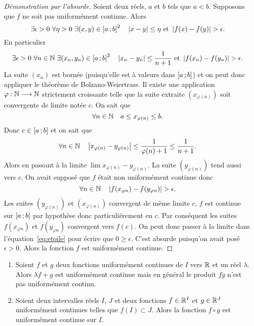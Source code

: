 \begin{proof}[Démonstration par l'absurde]
  Soient deux réels, $a$ et $b$ tels que $a<b$. Supposons que $f$ ne soit pas uniformément continue. Alors
  \begin{equation}
    \exists \epsilon > 0 \ \forall \eta > 0 \ \exists (x,y) \in \intervalleff{a}{b}^2 \quad \abs{x-y} \leq \eta \text{~et~} \abs{f(x)-f(y)} > \epsilon.
  \end{equation}
  En particulier
  \begin{equation}
    \exists \epsilon > 0 \ \forall n \in \N \ \exists (x_n,y_n) \in \intervalleff{a}{b}^2 \quad \abs{x_n-y_n} \leq \frac{1}{n+1} \text{~et~} \abs{f(x_n)-f(y_n)} > \epsilon.
  \end{equation}
  La suite $(x_n)$ est bornée (puisqu'elle est à valeurs dans $\left[ a \, ;  b \right]$) et on peut donc appliquer le théorème de Bolzano-Weiertrass. Il existe une application $\varphi : \mathbb{N} \longrightarrow \mathbb{N}$ strictement croissante telle que la suite extraite $(x_{\varphi(n)})$ soit convergente de limite notée $c$. On sait que
  \begin{equation}
    \forall n \in \mathbb{N} \quad a \leq x_{\varphi(n)} \leq b.
  \end{equation}
  Donc $c \in \left[ a \, ;  b \right]$ et on sait que
  \begin{equation}
    \forall n \in \mathbb{N} \quad \left\lvert x_{\varphi(n)}-y_{\varphi(n)}\right\rvert \leq \frac{1}{\varphi(n)+1} \leq \frac{1}{n+1}.
  \end{equation}
  Alors en passant à la limite $\lim x_{\varphi(n)}-y_{\varphi(n)}$. La suite $(y_{\varphi(n)})$ tend aussi vers $c$. On avait supposé que $f$ était non uniformément continue donc
  \begin{equation}\label{eq:etoile}
    \forall n \in \mathbb{N} \quad \left\lvert f(x_{\varphi{n}})-f(y_{\varphi{n}})\right\rvert > \epsilon.
  \end{equation}
  Les suites $(y_{\varphi(n)})$ et $(x_{\varphi(n)})$ convergent de même limite $c$, $f$ est continue sur $\left[ a \, ;  b \right]$ par hypothèse donc particuliérement en $c$. Par conséquent les suites $f(x_{\varphi{n}})$ et $f(y_{\varphi{n}})$ convergent vers $f(c)$. On peut donc passer à la limite dans l'équation~\ref{eq:etoile} pour écrire que $0 \geq \epsilon$. C'est absurde puisqu'on avait posé $\epsilon >0$. Alors la fonction $f$ est uniformément continue.
\end{proof}
\begin{prop}
  \begin{enumerate}
  \item Soient $f$ et $g$ deux fonctions uniformément continues de $I$ vers $\mathbb{R}$ et un réel $\lambda$. Alors $\lambda f +g$ est uniformément continue mais en général le produit $fg$ n'est pas uniformément continu.
  \item Soient deux intervalles réels $I$, $J$ et deux fonctions $f \in \mathbb{R}^I$ et $g\in \mathbb{R}^J$ uniformément continues telles que $f(I)\subset J$. Alors la fonction $f \circ g$ est uniformément continue sur $I$.
  \end{enumerate}
\end{prop}
